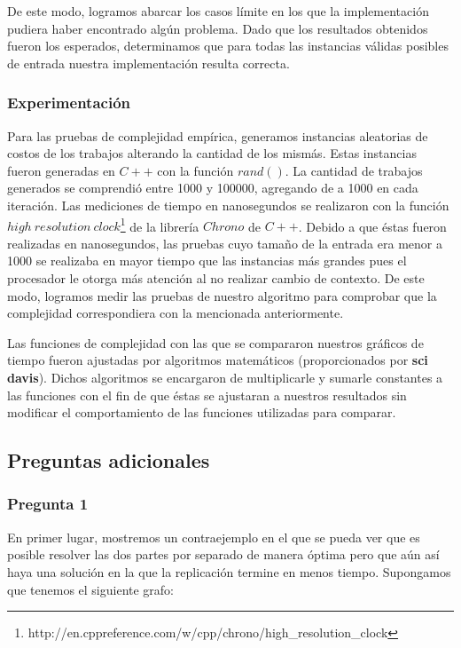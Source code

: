 De este modo, logramos abarcar los casos límite en los que la implementación pudiera haber encontrado algún problema. Dado que los resultados obtenidos fueron los esperados, determinamos que para todas las instancias válidas posibles de entrada nuestra implementación resulta correcta.

\subsubsection{Experimentación}

Para las pruebas de complejidad empírica, generamos instancias aleatorias de costos de los trabajos alterando la cantidad de los mismás. Estas instancias fueron generadas en $C++$ con la función $rand()$. La cantidad de trabajos generados se comprendió entre 1000 y 100000, agregando de a 1000 en cada iteración. Las mediciones de tiempo en nanosegundos se realizaron con la función $high\ resolution\ clock$\footnote{http://en.cppreference.com/w/cpp/chrono/high\_resolution\_clock} de la librería $Chrono$ de $C++$. Debido a que éstas fueron realizadas en nanosegundos, las pruebas cuyo tamaño de la entrada era menor a 1000 se realizaba en mayor tiempo que las instancias más grandes pues el procesador le otorga más atención al no realizar cambio de contexto. De este modo, logramos medir las pruebas de nuestro algoritmo para comprobar que la complejidad correspondiera con la mencionada anteriormente.

Las funciones de complejidad con las que se compararon nuestros gráficos de tiempo fueron ajustadas por algoritmos matemáticos (proporcionados por \textbf{sci davis}). Dichos algoritmos se encargaron de multiplicarle y sumarle constantes a las funciones con el fin de que éstas se ajustaran a nuestros resultados sin modificar el comportamiento de las funciones utilizadas para comparar.

\subsection{Preguntas adicionales}

\subsubsection{Pregunta 1}
En primer lugar, mostremos un contraejemplo en el que se pueda ver que es posible resolver las dos partes por separado de manera óptima pero que aún así haya una solución en la que la replicación termine en menos tiempo.\newline
\newline
Supongamos que tenemos el siguiente grafo:\newline

